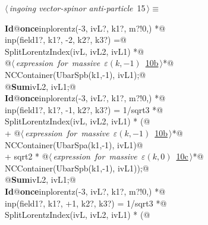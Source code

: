 \documentclass[a4paper,12pt]{amsart}
\renewcommand{\NWtarget}[2]{\hypertarget{#1}{#2}}
\renewcommand{\NWlink}[2]{\hyperlink{#1}{#2}}
\begin{document}
\begin{flushleft} \small
\begin{minipage}{\linewidth}\label{scrap34}\raggedright\small
\NWtarget{nuweb15}{} $\langle\,${\itshape ingoing vector-spinor anti-particle}\nobreak\ {\footnotesize {15}}$\,\rangle\equiv$
\vspace{-1ex}
\begin{list}{}{} \item
\mbox{}\verb@@\hbox{\sffamily\bfseries Id}\verb@ @\hbox{\sffamily\bfseries once}\verb@ inplorentz(-3, ivL?, k1?, m?!{0,}) *@\\
\mbox{}\verb@      inp(field1?, k1?, -2, k2?, k3?) =@\\
\mbox{}\verb@   SplitLorentzIndex(ivL, ivL2, ivL1) *@\\
\mbox{}\verb@   @\hbox{$\langle\,${\itshape expression for massive $\varepsilon(k, -1)$}\nobreak\ {\footnotesize \NWlink{nuweb10b}{10b}}$\,\rangle$}\verb@ *@\\
\mbox{}\verb@   NCContainer(UbarSpb(k1,-1), ivL1);@\\
\mbox{}\verb@   @\hbox{\sffamily\bfseries Sum}\verb@ ivL2, ivL1;@\\
\mbox{}\verb@@\hbox{\sffamily\bfseries Id}\verb@ @\hbox{\sffamily\bfseries once}\verb@ inplorentz(-3, ivL?, k1?, m?!{0,}) *@\\
\mbox{}\verb@      inp(field1?, k1?, -1, k2?, k3?) = 1/sqrt3 *@\\
\mbox{}\verb@   SplitLorentzIndex(ivL, ivL2, ivL1) * (@\\
\mbox{}\verb@   + @\hbox{$\langle\,${\itshape expression for massive $\varepsilon(k, -1)$}\nobreak\ {\footnotesize \NWlink{nuweb10b}{10b}}$\,\rangle$}\verb@ *@\\
\mbox{}\verb@     NCContainer(UbarSpa(k1,-1), ivL1)@\\
\mbox{}\verb@   + sqrt2 * @\hbox{$\langle\,${\itshape expression for massive $\varepsilon(k, 0)$}\nobreak\ {\footnotesize \NWlink{nuweb10c}{10c}}$\,\rangle$}\verb@ *@\\
\mbox{}\verb@     NCContainer(UbarSpb(k1,-1), ivL1));@\\
\mbox{}\verb@   @\hbox{\sffamily\bfseries Sum}\verb@ ivL2, ivL1;@\\
\mbox{}\verb@@\hbox{\sffamily\bfseries Id}\verb@ @\hbox{\sffamily\bfseries once}\verb@ inplorentz(-3, ivL?, k1?, m?!{0,}) *@\\
\mbox{}\verb@      inp(field1?, k1?, +1, k2?, k3?) = 1/sqrt3 *@\\
\mbox{}\verb@   SplitLorentzIndex(ivL, ivL2, ivL1) * (@\\

\end{list}
\end{minipage}
\end{flushleft}
\end{document}
